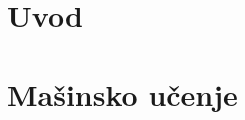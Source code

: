 \documentclass[12pt,oneside]{memoir}
\begin{document}
\frontmatter
\naslovna
\komisija
\posveta{}%
\apstrakt
\tableofcontents*

\mainmatter

\chapter{Uvod}




\chapter{Mašinsko učenje}
\label{chp:mašinsko učenje}

\end{document}
